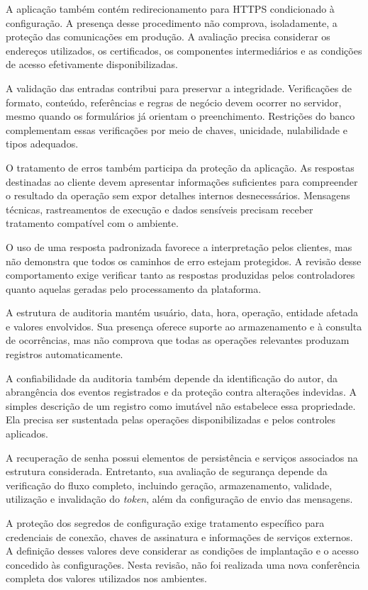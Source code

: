 A aplicação também contém redirecionamento para HTTPS condicionado à configuração. A presença desse procedimento não comprova, isoladamente, a proteção das comunicações em produção. A avaliação precisa considerar os endereços utilizados, os certificados, os componentes intermediários e as condições de acesso efetivamente disponibilizadas.

A validação das entradas contribui para preservar a integridade. Verificações de formato, conteúdo, referências e regras de negócio devem ocorrer no servidor, mesmo quando os formulários já orientam o preenchimento. Restrições do banco complementam essas verificações por meio de chaves, unicidade, nulabilidade e tipos adequados.

O tratamento de erros também participa da proteção da aplicação. As respostas destinadas ao cliente devem apresentar informações suficientes para compreender o resultado da operação sem expor detalhes internos desnecessários. Mensagens técnicas, rastreamentos de execução e dados sensíveis precisam receber tratamento compatível com o ambiente.

O uso de uma resposta padronizada favorece a interpretação pelos clientes, mas não demonstra que todos os caminhos de erro estejam protegidos. A revisão desse comportamento exige verificar tanto as respostas produzidas pelos controladores quanto aquelas geradas pelo processamento da plataforma.

A estrutura de auditoria mantém usuário, data, hora, operação, entidade afetada e valores envolvidos. Sua presença oferece suporte ao armazenamento e à consulta de ocorrências, mas não comprova que todas as operações relevantes produzam registros automaticamente.

A confiabilidade da auditoria também depende da identificação do autor, da abrangência dos eventos registrados e da proteção contra alterações indevidas. A simples descrição de um registro como imutável não estabelece essa propriedade. Ela precisa ser sustentada pelas operações disponibilizadas e pelos controles aplicados.

A recuperação de senha possui elementos de persistência e serviços associados na estrutura considerada. Entretanto, sua avaliação de segurança depende da verificação do fluxo completo, incluindo geração, armazenamento, validade, utilização e invalidação do \textit{token}, além da configuração de envio das mensagens.

A proteção dos segredos de configuração exige tratamento específico para credenciais de conexão, chaves de assinatura e informações de serviços externos. A definição desses valores deve considerar as condições de implantação e o acesso concedido às configurações. Nesta revisão, não foi realizada uma nova conferência completa dos valores utilizados nos ambientes.

